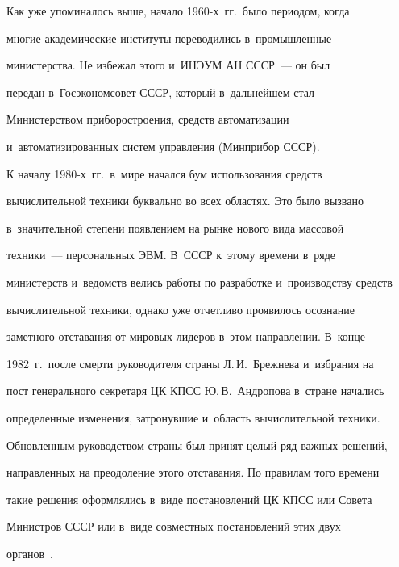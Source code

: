   

   Как уже упоминалось выше, начало 1960-х~гг.\ было периодом, когда 

многие академические институты переводились в~промышленные 

министерства. Не избежал этого и~ИНЭУМ АН \mbox{СССР}~---  он был 

передан в~Госэкономсовет \mbox{СССР}, который в~дальнейшем стал 

Министерством при\-бо\-ро\-стро\-ения, средств автоматизации 

и~автоматизированных сис\-тем управ\-ле\-ния (Минприбор \mbox{СССР}).

{



}

   

   К началу 1980-х~гг.\ в~мире начался бум использования средств 

вычислительной техники буквально во всех областях. Это было вызвано 

в~значительной степени появлением на рынке нового вида массовой 

техники~--- персональных ЭВМ. В~\mbox{СССР} к~этому времени в~ряде 

министерств и~ведомств велись работы по разработке и~производству средств 

вы\-чис\-ли\-тель\-ной техники, однако уже отчетливо проявилось осознание 

заметного отставания от мировых лидеров в~этом на\-прав\-ле\-нии. В~конце 

1982~г.\ после смер\-ти руководителя страны Л.\,И.~Бреж\-не\-ва и~избрания на 

пост генерального секретаря ЦК КПСС Ю.\,В.~Андропова в~стране начались 

определенные изменения, за\-тро\-нув\-шие и~об\-ласть вы\-чис\-ли\-тель\-ной техники. 

Обновленным руководством страны был принят целый ряд важ\-ных решений, 

на\-прав\-лен\-ных на преодоление этого отставания. По правилам того времени 

такие решения оформлялись в~виде по\-ста\-нов\-ле\-ний ЦК \mbox{КПСС} или Совета 

Министров \mbox{СССР} или в~виде совместных по\-ста\-нов\-ле\-ний этих двух 

органов~\cite{3-zah}.

{



}



